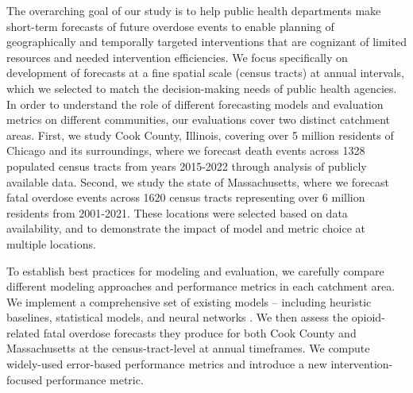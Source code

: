 The overarching goal of our study is to help public health departments make short-term forecasts of future overdose events to enable planning of geographically and temporally targeted interventions that are cognizant of limited resources and needed intervention efficiencies. We focus specifically on development of forecasts at a fine spatial scale (census tracts) at annual intervals, which we selected to match the decision-making needs of public health agencies. In order to understand the role of different forecasting models and evaluation metrics on different communities, our evaluations cover two distinct catchment areas. First, we study Cook County, Illinois, covering over 5 million residents of Chicago and its surroundings, where we forecast death events across 1328 populated census tracts from years 2015-2022 through analysis of publicly available data. Second, we study the state of Massachusetts, where we forecast fatal overdose events across 1620 census tracts representing over 6 million residents from 2001-2021. These locations were selected based on data availability, and to demonstrate the impact of model and metric choice at multiple locations.

To establish best practices for modeling and evaluation, we carefully compare different modeling approaches and performance metrics in each catchment area. We implement a comprehensive set of existing models -- including heuristic baselines, statistical models, \citep{marksMethodologicalApproachesPrediction2021,allenTranslatingPredictiveAnalytics2023,ertugrulCASTNetCommunityAttentiveSpatioTemporal2019,bauerSmallAreaForecasting2023} and neural networks \citep{ertugrulCASTNetCommunityAttentiveSpatioTemporal2019}. We then assess the opioid-related fatal overdose forecasts they produce for both Cook County and Massachusetts at the census-tract-level at annual timeframes. We compute widely-used error-based performance metrics and introduce a new intervention-focused performance metric.
